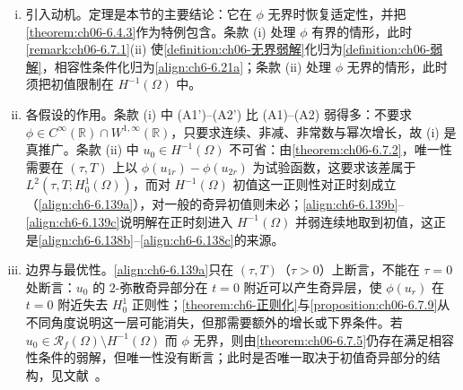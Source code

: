 \documentclass[../../main.tex]{subfiles}%
\begin{document}
\begin{remark}\label{remark:ch06-6.7.6动机}
\begin{enumerate}[(i)]
\item 引入动机。定理是本节的主要结论：它在 $\phi$ 无界时恢复适定性，并把\cref{theorem:ch06-6.4.3}作为特例包含。条款 (i) 处理 $\phi$ 有界的情形，此时\cref{remark:ch06-6.7.1}(ii) 使\cref{definition:ch06-无界弱解}化归为\cref{definition:ch06-弱解}，相容性条件化归为\eqref{align:ch6-6.21a}；条款 (ii) 处理 $\phi$ 无界的情形，此时须把初值限制在 $H^{-1}(\Omega)$ 中。

\item 各假设的作用。条款 (i) 中 (A1')--(A2') 比 (A1)--(A2) 弱得多：不要求 $\phi\in C^\infty(\mathbb{R})\cap W^{1,\infty}(\mathbb{R})$，只要求连续、非减、非常数与幂次增长，故 (i) 是真推广。条款 (ii) 中 $u_0\in H^{-1}(\Omega)$ 不可省：由\cref{theorem:ch06-6.7.2}，唯一性需要在 $(\tau,T)$ 上以 $\phi(u_{1r})-\phi(u_{2r})$ 为试验函数，这要求该差属于 $L^2(\tau,T;H^1_0(\Omega))$，而对 $H^{-1}(\Omega)$ 初值这一正则性对正时刻成立（\eqref{align:ch6-6.139a}），对一般的奇异初值则未必；\eqref{align:ch6-6.139b}--\eqref{align:ch6-6.139c}说明解在正时刻进入 $H^{-1}(\Omega)$ 并弱连续地取到初值，这正是\eqref{align:ch6-6.138b}--\eqref{align:ch6-6.138c}的来源。

\item 边界与最优性。\eqref{align:ch6-6.139a}只在 $(\tau,T)$（$\tau>0$）上断言，不能在 $\tau=0$ 处断言：$u_0$ 的 $2$-弥散奇异部分在 $t=0$ 附近可以产生奇异层，使 $\phi(u_r)$ 在 $t=0$ 附近失去 $H^1_0$ 正则性；\cref{theorem:ch6-正则化}与\cref{proposition:ch06-6.7.9}从不同角度说明这一层可能消失，但那需要额外的增长或下界条件。若 $u_0\in\mathscr{R}_f(\Omega)\setminus H^{-1}(\Omega)$ 而 $\phi$ 无界，则由\cref{theorem:ch06-6.7.5}仍存在满足相容性条件的弱解，但唯一性没有断言；此时是否唯一取决于初值奇异部分的结构，见文献~\cite{ref87}。
\end{enumerate}
\end{remark}
\end{document}
